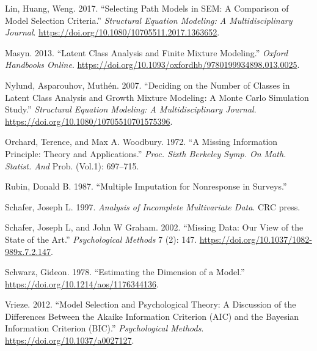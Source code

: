 \documentclass[
]{article}
\newlength{\cslhangindent}
\newenvironment{CSLReferences}[2] %
 {\begin{list}{}{%
  \setlength{\itemindent}{0pt}
  \setlength{\leftmargin}{0pt}
  \setlength{\parsep}{0pt}
  \ifodd #1
   \setlength{\leftmargin}{\cslhangindent}
   \setlength{\itemindent}{-1\cslhangindent}
  \fi
  \setlength{\itemsep}{#2\baselineskip}}}
 {\end{list}}
\begin{document}
\begin{CSLReferences}{1}{0}
Lin, Huang, Weng. 2017. {``Selecting {Path Models} in {SEM}: {A
Comparison} of {Model Selection Criteria}.''} \emph{Structural Equation
Modeling: A Multidisciplinary Journal}.
\url{https://doi.org/10.1080/10705511.2017.1363652}.

Masyn. 2013. {``Latent {Class Analysis} and {Finite Mixture
Modeling}.''} \emph{Oxford Handbooks Online}.
\url{https://doi.org/10.1093/oxfordhb/9780199934898.013.0025}.

Nylund, Asparouhov, Muthén. 2007. {``Deciding on the {Number} of
{Classes} in {Latent Class Analysis} and {Growth Mixture Modeling}: {A
Monte Carlo Simulation Study}.''} \emph{Structural Equation Modeling: A
Multidisciplinary Journal}.
\url{https://doi.org/10.1080/10705510701575396}.

Orchard, Terence, and Max A. Woodbury. 1972. {``A Missing Information
Principle: Theory and Applications.''} \emph{Proc. Sixth Berkeley Symp.
On Math. Statist. And} Prob. (Vol.1): 697--715.

Rubin, Donald B. 1987. {``Multiple {Imputation} for {Nonresponse} in
{Surveys}.''}

Schafer, Joseph L. 1997. \emph{Analysis of Incomplete Multivariate
Data}. CRC press.

Schafer, Joseph L, and John W Graham. 2002. {``Missing Data: Our View of
the State of the Art.''} \emph{Psychological Methods} 7 (2): 147.
\url{https://doi.org/10.1037/1082-989x.7.2.147}.

Schwarz, Gideon. 1978. {``Estimating the {Dimension} of a {Model}.''}
\url{https://doi.org/10.1214/aos/1176344136}.

Vrieze. 2012. {``Model Selection and Psychological Theory: {A}
Discussion of the Differences Between the {Akaike} Information Criterion
({AIC}) and the {Bayesian} Information Criterion ({BIC}).''}
\emph{Psychological Methods}. \url{https://doi.org/10.1037/a0027127}.

\end{CSLReferences}
\end{document}
